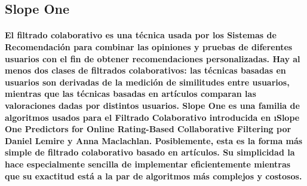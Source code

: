 \subsection{Slope One}
	\paragraph{El filtrado colaborativo es una técnica usada por los Sistemas de Recomendación para combinar las opiniones y pruebas de diferentes usuarios con el fin de obtener recomendaciones personalizadas. Hay al menos dos clases de filtrados colaborativos: las técnicas basadas en usuarios son derivadas de la medición de similitudes entre usuarios, mientras que las técnicas basadas en artículos comparan las valoraciones dadas por distintos usuarios. Slope One es una familia de algoritmos usados para el Filtrado Colaborativo introducida en \i{Slope One Predictors for Online Rating-Based Collaborative Filtering} por Daniel Lemire y Anna Maclachlan. Posiblemente, esta es la forma más simple de filtrado colaborativo basado en artículos. Su simplicidad la hace especialmente sencilla de implementar eficientemente mientras que su exactitud está a la par de algoritmos más complejos y costosos.}